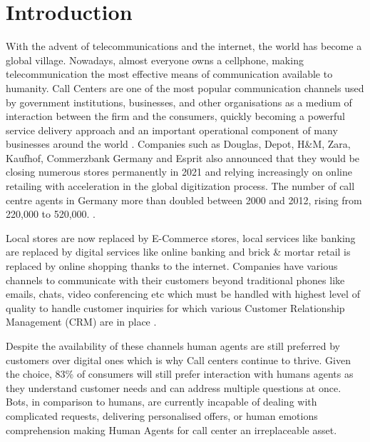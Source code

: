 \documentclass{article}
\begin{document}
\section{Introduction}
With the advent of telecommunications and the internet, the world has become a global village. Nowadays, almost everyone owns a cellphone, making telecommunication the most effective means of communication available to humanity. Call Centers are one of the most popular communication channels used by government institutions, businesses, and other organisations as a medium of interaction between the firm and the consumers, quickly becoming a powerful service delivery  approach and an important operational component of many businesses around the world \cite{chuchual_inbound_2010}. Companies such as Douglas, Depot, H\&M, Zara, Kaufhof, Commerzbank Germany \cite{commerzbank_commerzbank_2021} and Esprit also announced that they would be closing numerous stores permanently in 2021 and relying increasingly on online retailing with acceleration in the global digitization process. The number of call centre agents in Germany more than doubled between 2000 and 2012, rising from 220,000 to 520,000. \cite{herzog_callcenter_2017}. 


Local stores are now replaced by E-Commerce stores, local services like banking are replaced by digital services like online banking and brick \& mortar retail is replaced by online shopping thanks to the internet. Companies have various channels to communicate with their customers beyond traditional phones like emails, chats, video conferencing etc which must be handled with highest level of quality to handle customer inquiries for which various Customer Relationship Management (CRM) are in place \cite{glas_einzelhandel_2017}. 

Despite the availability of these channels human agents are still preferred by customers over digital ones which is why Call centers continue to thrive. Given the choice, 83\% of consumers will still prefer interaction with humans agents as they understand customer needs and can address multiple questions at once. Bots, in comparison to humans, are currently incapable of dealing with complicated requests, delivering personalised offers, or human emotions comprehension \cite{forrester_human_2017} making Human Agents for call center an irreplaceable asset. 
\end{document}
